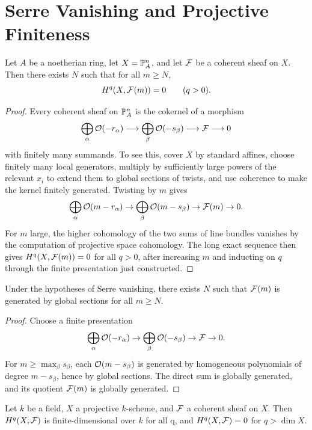 \section{Serre Vanishing and Projective Finiteness}

\begin{theorem}
Let \(A\) be a noetherian ring, let \(X=\mathbb{P}^n_A\), and let \(\mathcal{F}\) be a
coherent sheaf on \(X\).  Then there exists \(N\) such that for all \(m\ge N\),
\[
    H^q(X,\mathcal{F}(m))=0\qquad(q>0).
\]
\end{theorem}

\begin{proof}
Every coherent sheaf on \(\mathbb{P}^n_A\) is the cokernel of a morphism
\[
    \bigoplus_{\alpha}\mathcal{O}(-r_\alpha)\longrightarrow
    \bigoplus_{\beta}\mathcal{O}(-s_\beta)
    \longrightarrow \mathcal{F}\longrightarrow0
\]
with finitely many summands.  To see this, cover \(X\) by standard affines,
choose finitely many local generators, multiply by sufficiently large powers of
the relevant \(x_i\) to extend them to global sections of twists, and use
coherence to make the kernel finitely generated.  Twisting by \(m\) gives
\[
    \bigoplus_{\alpha}\mathcal{O}(m-r_\alpha)\to
    \bigoplus_{\beta}\mathcal{O}(m-s_\beta)\to \mathcal{F}(m)\to0.
\]
For \(m\) large, the higher cohomology of the two sums of line bundles vanishes
by the computation of projective space cohomology.  The long exact sequence
then gives \(H^q(X,\mathcal{F}(m))=0\) for all \(q>0\), after increasing \(m\) and
inducting on \(q\) through the finite presentation just constructed.
\end{proof}

\begin{theorem}
Under the hypotheses of Serre vanishing, there exists \(N\) such that
\(\mathcal{F}(m)\) is generated by global sections for all \(m\ge N\).
\end{theorem}

\begin{proof}
Choose a finite presentation
\[
    \bigoplus_{\alpha}\mathcal{O}(-r_\alpha)\to
    \bigoplus_{\beta}\mathcal{O}(-s_\beta)\to \mathcal{F}\to0.
\]
For \(m\ge\max_\beta s_\beta\), each \(\mathcal{O}(m-s_\beta)\) is generated by
homogeneous polynomials of degree \(m-s_\beta\), hence by global sections.  The
direct sum is globally generated, and its quotient \(\mathcal{F}(m)\) is globally
generated.
\end{proof}

\begin{theorem}
Let \(k\) be a field, \(X\) a projective \(k\)-scheme, and \(\mathcal{F}\) a coherent
sheaf on \(X\).  Then \(H^q(X,\mathcal{F})\) is finite-dimensional over \(k\) for all
q, and \(H^q(X,\mathcal{F})=0\) for \(q>\dim X\).
\end{theorem}

